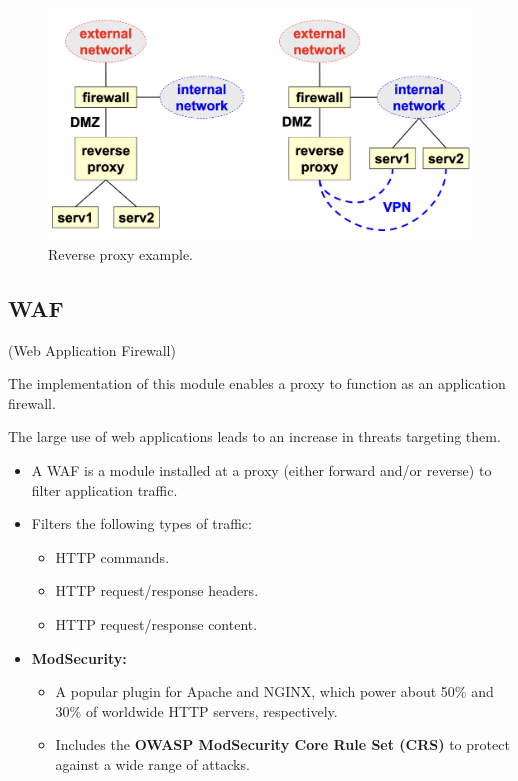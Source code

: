 \begin{figure}[H]
    \centering
    \includegraphics[width=0.5\linewidth]{Images/Firewalling/reverse_proxy.png}
    \caption{Reverse proxy example.}
\end{figure}

\subsection{WAF}
\begin{center}
(Web Application Firewall)
\end{center}

\begin{tcolorbox}[colback=blue!10!white, colframe=blue!50!white]
    The implementation of this module enables a proxy to function as an application firewall.
\end{tcolorbox}

The large use of web applications leads to an increase in threats targeting them.
\begin{itemize}
    \item A WAF is a module installed at a proxy (either forward and/or reverse) to filter application traffic.
    \item Filters the following types of traffic:
    \begin{itemize}
        \item HTTP commands.
        \item HTTP request/response headers.
        \item HTTP request/response content.
    \end{itemize}
    \item \textbf{ModSecurity:}
    \begin{itemize}
        \item A popular plugin for Apache and NGINX, which power about 50\% and 30\% of worldwide HTTP servers, respectively.
        \item Includes the \textbf{OWASP ModSecurity Core Rule Set (CRS)} to protect against a wide range of attacks.
    \end{itemize}
\end{itemize}
\clearpage
